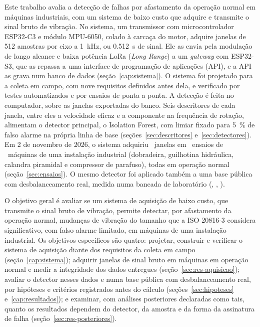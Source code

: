
Este trabalho avalia a detecção de falhas por afastamento da operação normal em máquinas industriais, com um sistema de baixo custo que adquire e transmite o sinal bruto de vibração. No sistema, um transmissor com microcontrolador ESP32-C3 e módulo MPU-6050, colado à carcaça do motor, adquire janelas de \num{512} amostras por eixo a \SI{1}{\kilo\hertz}, ou \SI{0,512}{\second} de sinal. Ele as envia pela modulação de longo alcance e baixa potência LoRa (\textit{Long Range}) a um \textit{gateway} com ESP32-S3, que as repassa a uma interface de programação de aplicações (API), e a API as grava num banco de dados (seção~\ref{cap:sistema}). O sistema foi projetado para a coleta em campo, com nove requisitos definidos antes dela, e verificado por testes automatizados e por ensaios de ponta a ponta. A detecção é feita no computador, sobre as janelas exportadas do banco. Seis descritores de cada janela, entre eles a velocidade eficaz e a componente na frequência de rotação, alimentam o detector principal, o Isolation Forest, com limiar fixado para \SI{5}{\percent} de falso alarme na própria linha de base (seções~\ref{sec:descritores} e~\ref{sec:detectores}). Em 2 de novembro de 2026, o sistema adquiriu \campoJanelasOperacao\ janelas em \campoEnsaios\ ensaios de \campoMaquinas\ máquinas de uma instalação industrial (dobradeira, guilhotina hidráulica, calandra piramidal e compressor de parafuso), todas em operação normal (seção~\ref{sec:ensaios}). O mesmo detector foi aplicado também a uma base pública com desbalanceamento real, medida numa bancada de laboratório (, \citeyear{mey2020}, \citeyear{mey2022dados}).

O objetivo geral é avaliar se um sistema de aquisição de baixo custo, que transmite o sinal bruto de vibração, permite detectar, por afastamento da operação normal, mudanças de vibração do tamanho que a ISO 20816-3 considera significativo, com falso alarme limitado, em máquinas de uma instalação industrial. Os objetivos específicos são quatro: projetar, construir e verificar o sistema de aquisição diante dos requisitos da coleta em campo (seção~\ref{cap:sistema}); adquirir janelas de sinal bruto em máquinas em operação normal e medir a integridade dos dados entregues (seção~\ref{sec:res-aquisicao}); avaliar o detector nesses dados e numa base pública com desbalanceamento real, por hipóteses e critérios registrados antes do cálculo (seções~\ref{sec:hipoteses} e~\ref{cap:resultados}); e examinar, com análises posteriores declaradas como tais, quanto os resultados dependem do detector, da amostra e da forma da assinatura de falha (seção~\ref{sec:res-posteriores}).

